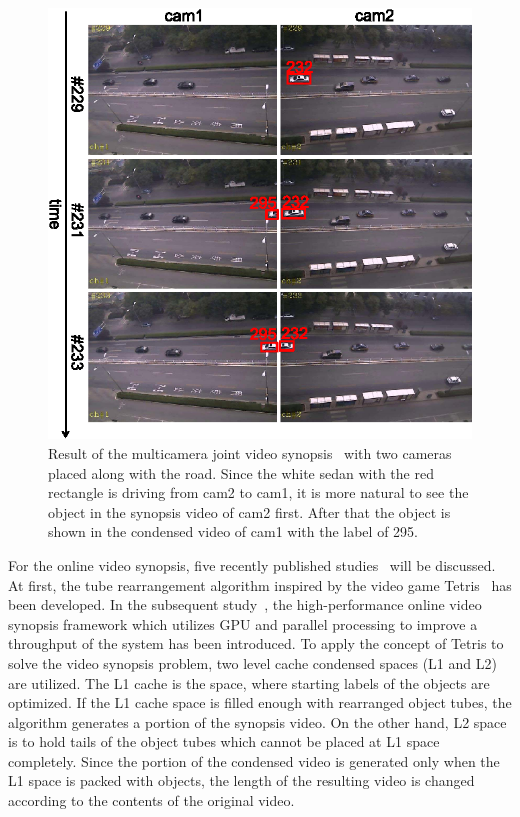 \documentclass[11pt]{hyu_thesis}
\begin{document}
\begin{figure}
	\centering
	\includegraphics[width=0.9\linewidth]{ext-zhu02.eps}
	\caption{Result of the multicamera joint video synopsis~\cite{Zhu2016} with two cameras placed along with the road. Since the white sedan with the red rectangle is driving from cam2 to cam1, it is more natural to see the object in the synopsis video of cam2 first. After that the object is shown in the condensed video of cam1 with the label of 295.}
	\label{fig:Zhu02}
\end{figure}

For the online video synopsis, five recently published studies~\cite{Feng2012,Fu2014,Zhu2015,He2017,He2017a} will be discussed. At first, the tube rearrangement algorithm inspired by the video game Tetris~\cite{Feng2012} has been developed. In the subsequent study~\cite{Zhu2015}, the high-performance online video synopsis framework which utilizes GPU and parallel processing to improve a throughput of the system has been introduced. To apply the concept of Tetris to solve the video synopsis problem, two level cache condensed spaces (L1 and L2) are utilized. The L1 cache is the space, where starting labels of the objects are optimized. If the L1 cache space is filled enough with rearranged object tubes, the algorithm generates a portion of the synopsis video. On the other hand, L2 space is to hold tails of the object tubes which cannot be placed at L1 space completely. Since the portion of the condensed video is generated only when the L1 space is packed with objects, the length of the resulting video is changed according to the contents of the original video. 
\end{document}
